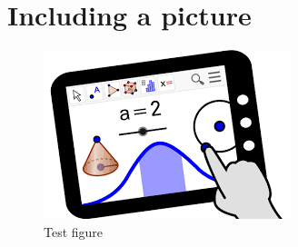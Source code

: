 \documentclass[a5paper]{article}
\begin{document}
\section{Including a picture}
\blindtext
\begin{figure}
\centering
\includegraphics{geo.png}
\caption{Test figure}
\end{figure}
\blindtext
\end{document}

